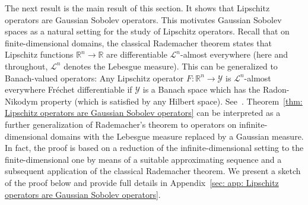 \documentclass[namedate,webpdf]{ima-authoring-template-blank}
\numberwithin{counter}{section}
\numberwithin{equation}{section}
\theoremstyle{plain}
\theoremstyle{definition}
\newcommand*{\cL}{\mathcal{L}}
\newcommand*{\cY}{\mathcal{Y}}
\newcommand*{\bbR}{\mathbb{R}}
\theoremstyle{thmstyletwo}
\begin{document}
The next result is the main result of this section. It shows that Lipschitz operators are Gaussian Sobolev operators. This motivates Gaussian Sobolev spaces as a natural setting for the study of Lipschitz operators. Recall that on finite-dimensional domains, the classical Rademacher theorem states that Lipschitz functions \( \bbR^n \to \bbR \) are differentiable \(\cL^n\)-almost everywhere (here and throughout, \( \cL^n \) denotes the Lebesgue measure). This can be generalized to Banach-valued operators: Any Lipschitz operator \( F : \bbR^n \to \cY \) is \(\cL^n\)-almost everywhere Fréchet differentiable if \( \cY \) is a Banach space which has the Radon-Nikodym property (which is satisfied by any Hilbert space). See~\citet[Prop. 6.41]{benyamini_GeometricNonlinearFunctionalAnalysis_1999}. Theorem~\ref{thm: Lipschitz operators are Gaussian Sobolev operators} can be interpreted as a further generalization of Rademacher's theorem to operators on infinite-dimensional domains with the Lebesgue measure replaced by a Gaussian measure. In fact, the proof is based on a reduction of the infinite-dimensional setting to the finite-dimensional one by means of a suitable approximating sequence and a subsequent application of the classical Rademacher theorem. We present a sketch of the proof below and provide full details in Appendix~\ref{sec: app: Lipschitz operators are Gaussian Sobolev operators}.
\end{document}

